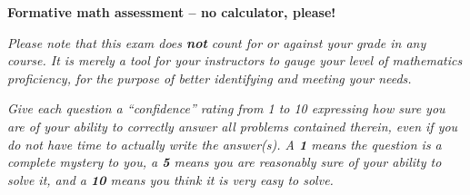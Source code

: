 
\centerline{\bf Formative math assessment -- no calculator, please!} \bigskip 

\vskip 10pt

\noindent
{}

\vskip 15pt

\noindent
{\it Please note that this exam does {\bf not} count for or against your grade in any course.  It is merely a tool for your instructors to gauge your level of mathematics proficiency, for the purpose of better identifying and meeting your needs.}

\vskip 10pt

\noindent
{\it Give each question a ``confidence'' rating from 1 to 10 expressing how sure you are of your ability to correctly answer all problems contained therein, even if you do not have time to actually write the answer(s).  A {\bf 1} means the question is a complete mystery to you, a {\bf 5} means you are reasonably sure of your ability to solve it, and a {\bf 10} means you think it is very easy to solve.}

\vskip 10pt

\noindent
{}

\vskip 10pt


